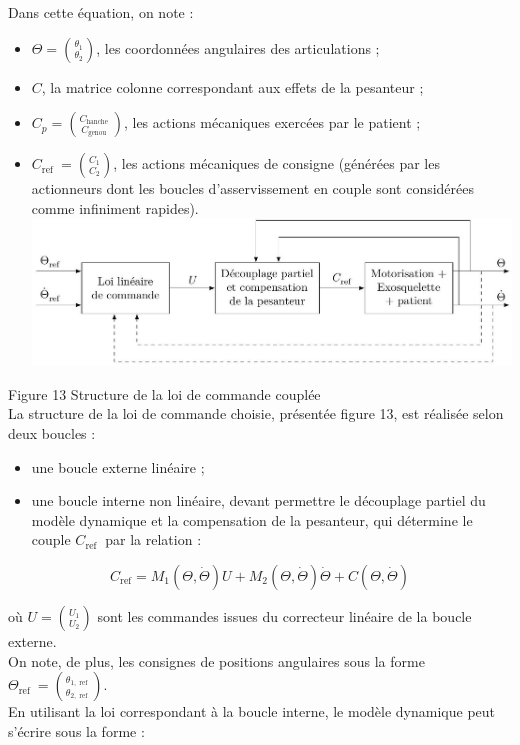 \documentclass[10pt]{article}
\begin{document}
Dans cette équation, on note :

\begin{itemize}
  \item $\Theta=\binom{\theta_{1}}{\theta_{2}}$, les coordonnées angulaires des articulations ;
  \item $C$, la matrice colonne correspondant aux effets de la pesanteur ;
  \item $C_{p}=\binom{C_{\text {hanche }}}{C_{\text {genou }}}$, les actions mécaniques exercées par le patient ;
  \item $C_{\text {ref }}=\binom{C_{1}}{C_{2}}$, les actions mécaniques de consigne (générées par les actionneurs dont les boucles d'asservissement en couple sont considérées comme infiniment rapides).\\
\includegraphics[max width=\textwidth, center]{2025_07_03_97545f5dc188959e5663g-10}
\end{itemize}

Figure 13 Structure de la loi de commande couplée\\
La structure de la loi de commande choisie, présentée figure 13, est réalisée selon deux boucles :

\begin{itemize}
  \item une boucle externe linéaire ;
  \item une boucle interne non linéaire, devant permettre le découplage partiel du modèle dynamique et la compensation de la pesanteur, qui détermine le couple $C_{\text {ref }}$ par la relation :
\end{itemize}

$$
C_{\mathrm{ref}}=M_{1}(\Theta, \dot{\Theta}) U+M_{2}(\Theta, \dot{\Theta}) \dot{\Theta}+C(\Theta, \dot{\Theta})
$$

où $U=\binom{U_{1}}{U_{2}}$ sont les commandes issues du correcteur linéaire de la boucle externe.\\
On note, de plus, les consignes de positions angulaires sous la forme $\Theta_{\text {ref }}=\binom{\theta_{1, \text { ref }}}{\theta_{2, \text { ref }}}$.\\
En utilisant la loi correspondant à la boucle interne, le modèle dynamique peut s'écrire sous la forme :
\end{document}
